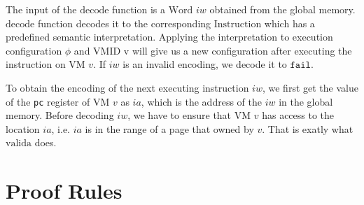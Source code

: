 \documentclass[a4paper]{article}
\newcommand*{\WORD}{\text{Word}}
\newcommand*{\VMID}{\text{VMID}}
\newcommand*{\INSTR}{\text{Instruction}}
\newcommand*{\decode}{\text{decode}}
\newcommand*{\valida}{\text{valida}}
\begin{document}


The input of the $\decode$ function is a $\WORD$ $iw$ obtained from the global memory. $\decode$ function decodes it to the corresponding $\INSTR$ which has a predefined semantic interpretation. Applying the interpretation to execution configuration $\phi$ and $\VMID$ v will give us a new configuration after executing the instruction on VM $v$. If $iw$ is an invalid encoding, we decode it to $\mathtt{fail}$.

To obtain the encoding of the next executing instruction $iw$, we first get the value of the \texttt{pc} register of VM $v$ as $ia$, which is the address of the $iw$ in the global memory. Before decoding $iw$, we have to ensure that VM $v$ has access to the location $ia$, i.e. $ia$ is in the range of a page that owned by $v$. That is exatly what $\valida$ does.

\section{Proof Rules}
\end{document}
